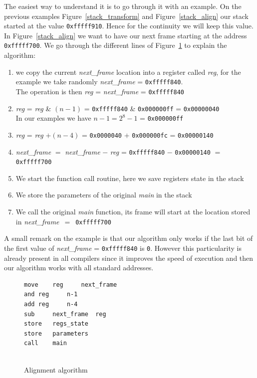 \documentclass[11pt]{sdm}
\begin{document}
The easiest way to understand it is to go through it with an example. On the previous examples Figure~\ref{stack_transform} and Figure~\ref{stack_align} our stack started at the value \texttt{0xfffff910}. Hence for the continuity we will keep this value. In Figure~\ref{stack_align} we want to have our next frame starting at the address \texttt{0xfffff700}. We go through the different lines of Figure~\ref{align_algo} to explain the algorithm:
\begin{enumerate}
	\item we copy the current \textit{next\_frame} location into a register called \textit{reg}, for the example we take randomly \textit{next\_frame} =  \texttt{0xfffff840}.\\
		The operation is then \textit{reg} = \textit{next\_frame} = \texttt{0xfffff840}
	\item \textit{reg} = \textit{reg} \& $(n-1)$ = \texttt{0xfffff840} \& \texttt{0x000000ff} = \texttt{0x00000040}\\
		In our examples we have $n-1 = 2^8-1$ = \texttt{0x000000ff}
	\item \textit{reg} = \textit{reg} $+(n-4)$ = \texttt{0x0000040} $+$ \texttt{0x000000fc} = \texttt{0x00000140}
	\item \textit{next\_frame} $=$ \textit{next\_frame} $-$ \textit{reg} = \texttt{0xfffff840} $-$ \texttt{0x00000140} $=$ \texttt{0xfffff700}
	\item We start the function call routine, here we save registers state in the stack
	\item We store the parameters of the original \textit{main} in the stack
	\item We call the original \textit{main} function, its frame will start at the location stored in \textit{next\_frame}~$=$~\texttt{0xfffff700}
\end{enumerate}

A small remark on the example is that our algorithm only works if the last bit of the first value of \textit{next\_frame} = \texttt{0xfffff840} is \texttt{0}. However this particularity is already present in all compilers since it improves the speed of execution and then our algorithm works with all standard addresses.
\begin{figure}[!ht]
\centering
\begin{lstlisting}
move	reg		next_frame  
and	reg		n-1	    
add	reg		n-4    
sub 	next_frame	reg
store 	regs_state
store	parameters
call	main
	
\end{lstlisting}
\caption{Alignment algorithm}
\label{align_algo}
\end{figure}
\end{document}

